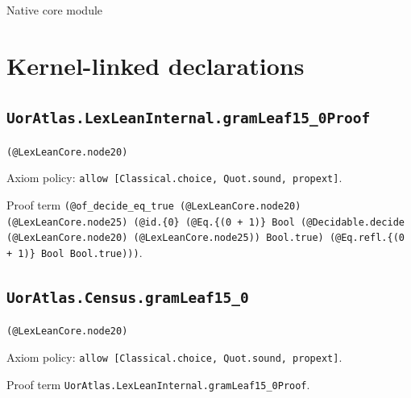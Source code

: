 \documentclass[11pt]{article}
\begin{document}
\begin{center}{\LARGE Native core module}\end{center}
\section*{Kernel-linked declarations}
\subsection*{\texttt{UorAtlas.LexLeanInternal.gramLeaf15\_0Proof}}
\noindent\texttt{(@LexLeanCore.node20)}\par
\noindent Axiom policy: \texttt{allow [Classical.choice, Quot.sound, propext]}.\par
\noindent Proof term \texttt{(@of\_decide\_eq\_true (@LexLeanCore.node20) (@LexLeanCore.node25) (@id.\{0\} (@Eq.\{(0 + 1)\} Bool (@Decidable.decide (@LexLeanCore.node20) (@LexLeanCore.node25)) Bool.true) (@Eq.refl.\{(0 + 1)\} Bool Bool.true)))}.\par
\subsection*{\texttt{UorAtlas.Census.gramLeaf15\_0}}
\noindent\texttt{(@LexLeanCore.node20)}\par
\noindent Axiom policy: \texttt{allow [Classical.choice, Quot.sound, propext]}.\par
\noindent Proof term \texttt{UorAtlas.LexLeanInternal.gramLeaf15\_0Proof}.\par
\end{document}

